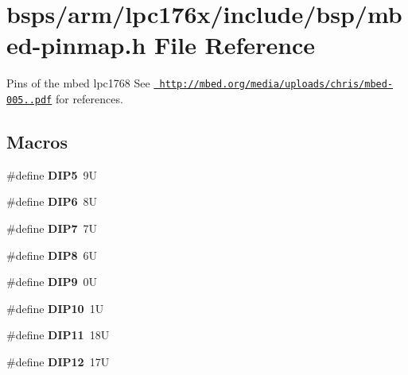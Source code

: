 \hypertarget{mbed-pinmap_8h}{}\section{bsps/arm/lpc176x/include/bsp/mbed-\/pinmap.h File Reference}
\label{mbed-pinmap_8h}


Pins of the mbed lpc1768 See \href{http://mbed.org/media/uploads/chris/mbed-005.1.pdf}{\texttt{ http\+://mbed.\+org/media/uploads/chris/mbed-\/005..\+pdf}} for references.  


\subsection*{Macros}
\begin{DoxyCompactItemize}
\item 
\mbox{\label{mbed-pinmap_8h_a14702a62d1258d182cdc7ec930eff7e3}} 
\#define {\bfseries D\+I\+P5}~9U
\item 
\mbox{\label{mbed-pinmap_8h_a994430c2158e8f410b5378c608286070}} 
\#define {\bfseries D\+I\+P6}~8U
\item 
\mbox{\label{mbed-pinmap_8h_a3a2acae1f1effa8eed1d91614ed24a3f}} 
\#define {\bfseries D\+I\+P7}~7U
\item 
\mbox{\label{mbed-pinmap_8h_aa3953155a9dd5dbeaf2cc1c85881818c}} 
\#define {\bfseries D\+I\+P8}~6U
\item 
\mbox{\label{mbed-pinmap_8h_a171ac466f92794ed07fec1977e560006}} 
\#define {\bfseries D\+I\+P9}~0U
\item 
\mbox{\label{mbed-pinmap_8h_a3f6a69e43d94692176b99de61a3fe564}} 
\#define {\bfseries D\+I\+P10}~1U
\item 
\mbox{\label{mbed-pinmap_8h_a6dc365fc55d5a6bed32e4d24258d74b4}} 
\#define {\bfseries D\+I\+P11}~18U
\item 
\mbox{\label{mbed-pinmap_8h_a2dd1a4b2e44eb745568a850c28cb9803}} 
\#define {\bfseries D\+I\+P12}~17U
\item 
\mbox{\label{mbed-pinmap_8h_a717ff445ff5f2fe86c8f30832cb3be00}} 

\end{DoxyCompactItemize}
